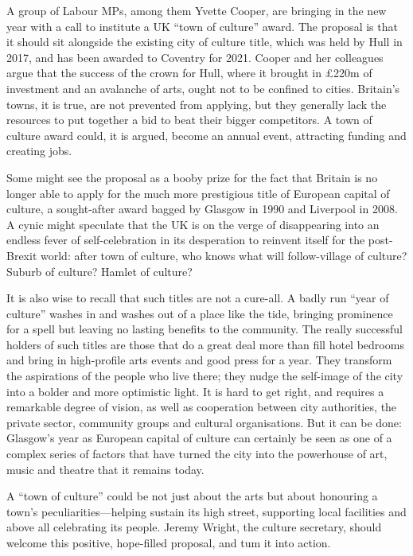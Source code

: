 A group of Labour MPs, among them Yvette Cooper, are bringing in the new year with a call to institute a UK ``town of culture'' award. The proposal is that it should sit alongside the existing city of culture title, which was held by Hull in 2017, and has been awarded to Coventry for 2021. Cooper and her colleagues argue that the success of the crown for Hull, where it brought in £220m of investment and an avalanche of arts, ought not to be confined to cities. Britain's towns, it is true, are not prevented from applying, but they generally lack the resources to put together a bid to beat their bigger competitors. A town of culture award could, it is argued, become an annual event, attracting funding and creating jobs.


Some might see the proposal as a booby prize for the fact that Britain is no longer able to apply for the much more prestigious title of European capital of culture, a sought-after award bagged by Glasgow in 1990 and Liverpool in 2008. A cynic might speculate that the UK is on the verge of disappearing into an endless fever of self-celebration in its desperation to reinvent itself for the post-Brexit world: after town of culture, who knows what will follow-village of culture? Suburb of culture? Hamlet of culture?


It is also wise to recall that such titles are not a cure-all. A badly run ``year of culture'' washes in and washes out of a place like the tide, bringing prominence for a spell but leaving no lasting benefits to the community. The really successful holders of such titles are those that do a great deal more than fill hotel bedrooms and bring in high-profile arts events and good press for a year. They transform the aspirations of the people who live there; they nudge the self-image of the city into a bolder and more optimistic light. It is hard to get right, and requires a remarkable degree of vision, as well as cooperation between city authorities, the private sector, community groups and cultural organisations. But it can be done: Glasgow's year as European capital of culture can certainly be seen as one of a complex series of factors that have turned the city into the powerhouse of art, music and theatre that it remains today.


A ``town of culture'' could be not just about the arts but about honouring a town's peculiarities—helping sustain its high street, supporting local facilities and above all celebrating its people. Jeremy Wright, the culture secretary, should welcome this positive, hope-filled proposal, and tum it into action.